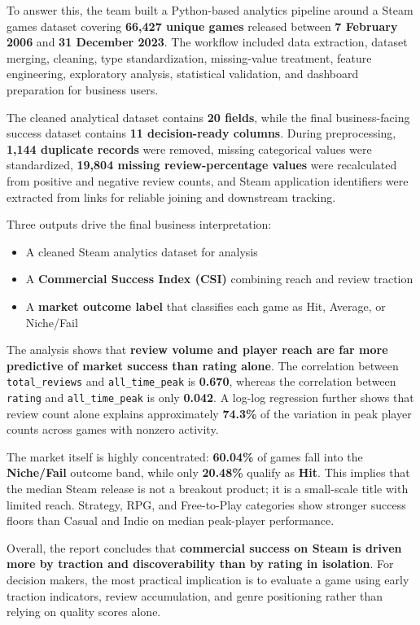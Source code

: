 \documentclass[12pt,a4paper]{report}
\begin{document}
To answer this, the team built a Python-based analytics pipeline around a Steam games dataset covering \textbf{66,427 unique games} released between \textbf{7 February 2006} and \textbf{31 December 2023}. The workflow included data extraction, dataset merging, cleaning, type standardization, missing-value treatment, feature engineering, exploratory analysis, statistical validation, and dashboard preparation for business users.

The cleaned analytical dataset contains \textbf{20 fields}, while the final business-facing success dataset contains \textbf{11 decision-ready columns}. During preprocessing, \textbf{1,144 duplicate records} were removed, missing categorical values were standardized, \textbf{19,804 missing review-percentage values} were recalculated from positive and negative review counts, and Steam application identifiers were extracted from links for reliable joining and downstream tracking.

Three outputs drive the final business interpretation:
\begin{itemize}
\item A cleaned Steam analytics dataset for analysis
\item A \textbf{Commercial Success Index (CSI)} combining reach and review traction
\item A \textbf{market outcome label} that classifies each game as Hit, Average, or Niche/Fail
\end{itemize}

The analysis shows that \textbf{review volume and player reach are far more predictive of market success than rating alone}. The correlation between \texttt{total\_reviews} and \texttt{all\_time\_peak} is \textbf{0.670}, whereas the correlation between \texttt{rating} and \texttt{all\_time\_peak} is only \textbf{0.042}. A log-log regression further shows that review count alone explains approximately \textbf{74.3\%} of the variation in peak player counts across games with nonzero activity.

The market itself is highly concentrated: \textbf{60.04\%} of games fall into the \textbf{Niche/Fail} outcome band, while only \textbf{20.48\%} qualify as \textbf{Hit}. This implies that the median Steam release is not a breakout product; it is a small-scale title with limited reach. Strategy, RPG, and Free-to-Play categories show stronger success floors than Casual and Indie on median peak-player performance.

Overall, the report concludes that \textbf{commercial success on Steam is driven more by traction and discoverability than by rating in isolation}. For decision makers, the most practical implication is to evaluate a game using early traction indicators, review accumulation, and genre positioning rather than relying on quality scores alone.
\end{document}
